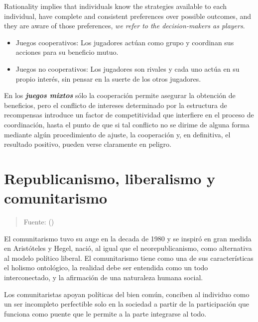 \documentclass[
  letterpaper,
  DIV=11,
  numbers=noendperiod]{scrreprt}
\begin{document}
Rationality implies that individuals know the strategies available to
each individual, have complete and consistent preferences over possible
outcomes, and they are aware of those preferences, \emph{we refer to the
decision-makers as players}.

\begin{itemize}
\item
  Juegos cooperativos: Los jugadores actúan como grupo y coordinan sus
  acciones para su beneficio mutuo.
\item
  Juegos no cooperativos: Los jugadores son rivales y cada uno actúa en
  su propio interés, sin pensar en la suerte de los otros jugadores.
\end{itemize}

En los \textbf{\emph{juegos mixtos}} sólo la cooperación permite
asegurar la obtención de beneficios, pero el conflicto de intereses
determinado por la estructura de recompensas introduce un factor de
competitividad que interfiere en el proceso de coordinación, hasta el
punto de que si tal conflicto no se dirime de alguna forma mediante
algún procedimiento de ajuste, la cooperación y, en definitiva, el
resultado positivo, pueden verse claramente en peligro.

\section{Republicanismo, liberalismo y
comunitarismo}\label{republicanismo-liberalismo-y-comunitarismo}

\begin{quote}
Fuente: ()
\end{quote}

El comunitarismo tuvo su auge en la decada de 1980 y se inspiró en gran
medida en Aristóteles y Hegel, nació, al igual que el neorepublicanismo,
como alternativa al modelo político liberal. El comunitarismo tiene como
una de sus características el holismo ontológico, la realidad debe ser
entendida como un todo interconectado, y la afirmación de una naturaleza
humana social.

Los comunitaristas apoyan políticas del bien común, conciben al
individuo como un ser incompleto perfectible solo en la sociedad a
partir de la participación que funciona como puente que le permite a la
parte integrarse al todo.
\end{document}
